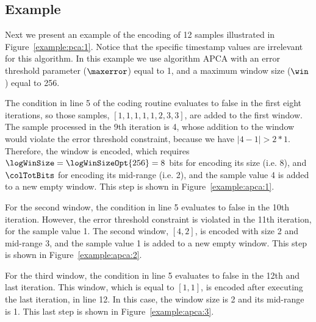 




\subsection{Example}
\label{algo:apca:example}


Next we present an example of the encoding of 12 samples illustrated in Figure~\ref{example:pca:1}. Notice that the specific timestamp values are irrelevant for this algorithm. In this example we use algorithm APCA with an error threshold parameter ($\maxerror$) equal to 1, and a maximum window size ($\win$) equal to 256. 


The condition in line 5 of the coding routine evaluates to false in the first eight iterations, so those samples, $[1, 1, 1, 1, 1, 2, 3, 3]$, are added to the first window. The sample processed in the 9th iteration is 4, whose addition to the window would violate the error threshold constraint, because we have $|4 - 1| > 2*1$. Therefore, the window is encoded, which requires $\logWinSize = \logWinSizeOpt{256}=8$ bits for encoding its size (i.e. 8), and $\colTotBits$ for encoding its mid-range (i.e. 2), and the sample value 4 is added to a new empty window. This step is shown in Figure~\ref{example:apca:1}.




For the second window, the condition in line 5 evaluates to false in the 10th iteration. However, the error threshold constraint is violated in the 11th iteration, for the sample value 1. The second window, $[4, 2]$, is encoded with size 2 and mid-range 3, and the sample value 1 is added to a new empty window. This step is shown in Figure~\ref{example:apca:2}.




For the third window, the condition in line 5 evaluates to false in the 12th and last iteration. This window, which is equal to $[1, 1]$, is encoded after executing the last iteration, in line 12. In this case, the window size is 2 and its mid-range is 1. This last step is shown in Figure~\ref{example:apca:3}.


